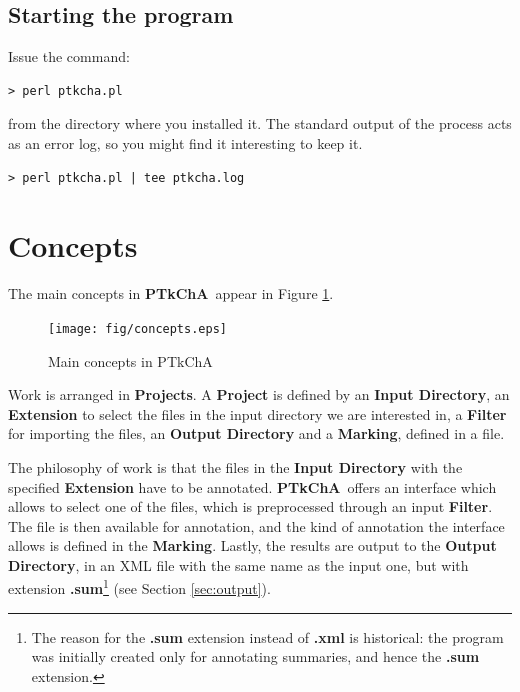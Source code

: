 \documentclass{article}
\newcommand{\ptkcha}{\textbf{PTkChA}}
\begin{document}
\subsection{Starting the program}
Issue the command:

\begin{verbatim}
> perl ptkcha.pl
\end{verbatim}

\noindent from the directory where you installed it. The standard
output of the process acts as an error log, so you might find it
interesting to keep it.

\begin{verbatim}
> perl ptkcha.pl | tee ptkcha.log
\end{verbatim}

\section{Concepts}
\label{sec:concepts}

The main concepts in \ptkcha\ appear in Figure \ref{fig:concepts}.

\begin{figure}[ht]
\begin{center}

\texttt{[image: fig/concepts.eps]}

\caption{Main concepts in PTkChA}
\label{fig:concepts}
\end{center}
\end{figure}

Work is arranged in \textbf{Projects}. A \textbf{Project} is defined
by an \textbf{Input Directory}, an \textbf{Extension} to select the
files in the input directory we are interested in, a \textbf{Filter}
for importing the files, an \textbf{Output Directory} and a
\textbf{Marking}, defined in a file.

The philosophy of work is that the files in the \textbf{Input
Directory} with the specified \textbf{Extension} have to be
annotated. \ptkcha\ offers an interface which allows to select one of
the files, which is preprocessed through an input \textbf{Filter}. The
file is then available for annotation, and the kind of annotation the
interface allows is defined in the \textbf{Marking}. Lastly, the
results are output to the \textbf{Output Directory}, in an XML file
with the same name as the input one, but with extension
\textbf{.sum}\footnote{The reason for the \textbf{.sum} extension
instead of \textbf{.xml} is historical: the program was initially
created only for annotating summaries, and hence the \textbf{.sum}
extension.} (see Section \ref{sec:output}).
\end{document}
